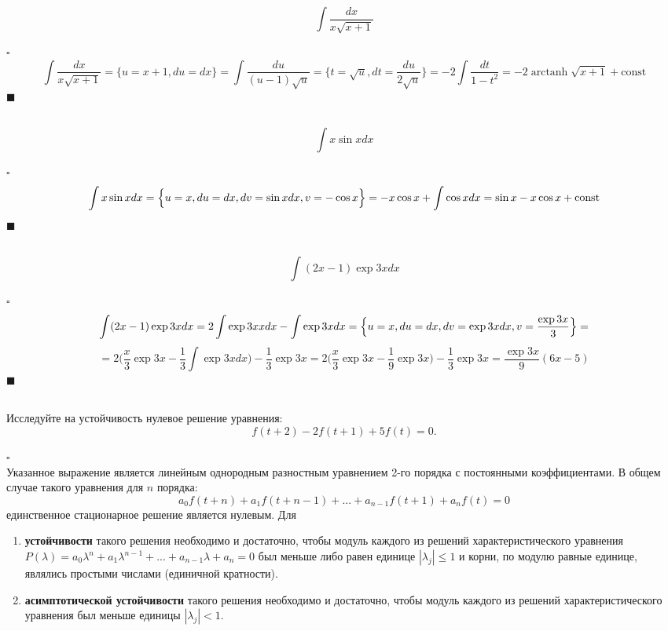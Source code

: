 \documentclass[a4paper]{article}
\DeclareMathOperator\arctanh{arctanh}
\newcommand{\solutionstart}{{\noindent $\square$ \\}}
\newcommand{\solutionend}{{\noindent $\blacksquare$ \\}}
\begin{document}
\subsection{}
\[
\int \frac{dx}{x \sqrt{x + 1}}
\]

\solutionstart
\[
\int \frac{dx}{x \sqrt{x + 1}} = \Biggl\{ u = x + 1, du = dx \Biggr\} = \int \frac{du}{(u - 1) \sqrt{u}} = \Biggl\{ t = \sqrt{u}, dt = \frac{du}{2 \sqrt{u}} \Biggr\} = -2 \int \frac{dt}{1 - t^2} = -2 \arctanh \sqrt{x + 1} + \text{const}
\]
\solutionend

\subsection{}
\[
\int x \sin{x} dx
\]

\solutionstart
\[
\int x \sin{x} dx = \Bigl\{ u = x, du = dx, dv = \sin{x} dx, v = -\cos{x} \Bigr\} = -x \cos{x} + \int \cos{x} dx = \sin{x} - x \cos{x} + \text{const}
\]
\solutionend


\subsection{}
\[
\int (2x - 1) \exp{3x} dx
\]

\solutionstart
\[
\int (2x - 1) \exp{3x} dx = 2 \int \exp{3x} x dx - \int \exp{3x} dx = \Bigl\{ u = x, du = dx, dv = \exp{3x} dx, v = \frac{\exp{3x}}{3} \Bigr\} = 
\]
\[
= 2 \biggl( \frac{x}{3} \exp{3x} - \frac1{3} \int \exp{3x} dx \biggr) - \frac1{3} \exp{3x} = 2 \biggl( \frac{x}{3} \exp{3x} - \frac1{9} \exp{3x} \biggr) - \frac1{3} \exp{3x} = \frac{\exp{3x}}{9} (6 x - 5)
\]
\solutionend

\subsection{}
Исследуйте на устойчивость нулевое решение уравнения:
\[
	f(t + 2) - 2 f (t + 1) + 5 f(t) = 0.
\]

\solutionstart
Указанное выражение является линейным однородным разностным уравнением 2-го порядка с постоянными коэффициентами. В общем случае такого уравнения для $n$ порядка:
\[
a_0 f (t + n) + a_1 f(t + n - 1) + ... + a_{n-1} f(t + 1) + a_n f(t) = 0
\]
единственное стационарное решение является нулевым. Для 
\begin{enumerate}
\item \textbf{устойчивости} такого решения необходимо и достаточно, чтобы модуль каждого из решений характеристического уравнения $P(\lambda) = a_{0} \lambda^{n} + a_{1} \lambda^{n - 1} + ... + a_{n - 1} \lambda + a_{n} = 0$ был меньше либо равен единице $|\lambda_j| \le 1$ и корни, по модулю равные единице, являлись простыми числами (единичной кратности).
\item \textbf{асимптотической устойчивости} такого решения необходимо и достаточно, чтобы модуль каждого из решений характеристического уравнения был меньше единицы $|\lambda_j| < 1$.
\end{enumerate}
\end{document}
